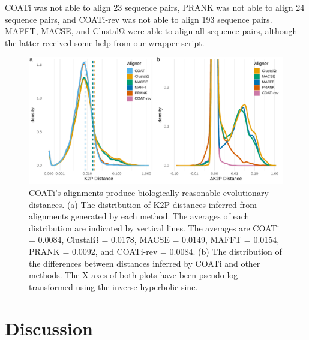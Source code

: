 \documentclass[12pt,letterpaper]{article}
\begin{document}
COATi was not able to align 23 sequence pairs, PRANK was not able to align 24 sequence pairs, and COATi-rev was not able to align 193 sequence pairs. MAFFT, MACSE, and ClustalΩ were able to align all sequence pairs, although the latter received some help from our wrapper script.

\begin{figure}[h!]
    \centering%
    \includegraphics{figures/fig-k2p-empirical.pdf}
    \par
    \caption{COATi's alignments produce biologically reasonable evolutionary distances. (a) The distribution of K2P distances inferred from alignments generated by each method. The averages of each distribution are indicated by vertical lines. The averages are COATi = 0.0084, ClustalΩ = 0.0178, MACSE = 0.0149, MAFFT = 0.0154, PRANK = 0.0092, and COATi-rev = 0.0084. (b) The distribution of the differences between distances inferred by COATi and other methods. The X-axes of both plots have been pseudo-log transformed using the inverse hyperbolic sine.}
    \label{fig:k2p-empirical}
\end{figure}


\section*{Discussion}
\end{document}

